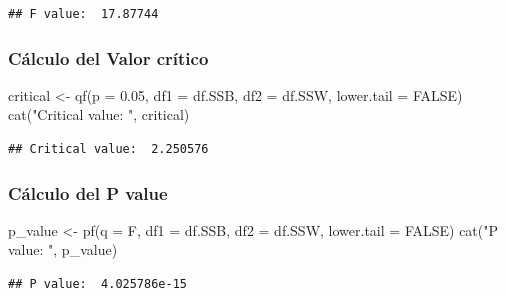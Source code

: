 \documentclass[
]{article}
\newenvironment{Shaded}{\begin{snugshade}}{\end{snugshade}}
\newcommand{\AttributeTok}[1]{\textcolor[rgb]{0.77,0.63,0.00}{#1}}
\newcommand{\ConstantTok}[1]{\textcolor[rgb]{0.00,0.00,0.00}{#1}}
\newcommand{\FloatTok}[1]{\textcolor[rgb]{0.00,0.00,0.81}{#1}}
\newcommand{\FunctionTok}[1]{\textcolor[rgb]{0.00,0.00,0.00}{#1}}
\newcommand{\NormalTok}[1]{#1}
\newcommand{\OtherTok}[1]{\textcolor[rgb]{0.56,0.35,0.01}{#1}}
\newcommand{\StringTok}[1]{\textcolor[rgb]{0.31,0.60,0.02}{#1}}
\begin{document}
\begin{verbatim}
## F value:  17.87744
\end{verbatim}

\vspace{0.3cm}

\hypertarget{cuxe1lculo-del-valor-cruxedtico}{%
\subsubsection{Cálculo del Valor
crítico}\label{cuxe1lculo-del-valor-cruxedtico}}

\vspace{0.3cm}

\begin{Shaded}
\begin{Highlighting}[]
\NormalTok{critical }\OtherTok{\textless{}{-}} \FunctionTok{qf}\NormalTok{(}\AttributeTok{p =} \FloatTok{0.05}\NormalTok{, }\AttributeTok{df1 =}\NormalTok{ df.SSB, }\AttributeTok{df2 =}\NormalTok{ df.SSW, }\AttributeTok{lower.tail =} \ConstantTok{FALSE}\NormalTok{)}
\FunctionTok{cat}\NormalTok{(}\StringTok{"Critical value: "}\NormalTok{, critical)}
\end{Highlighting}
\end{Shaded}

\begin{verbatim}
## Critical value:  2.250576
\end{verbatim}

\newpage

\hypertarget{cuxe1lculo-del-p-value}{%
\subsubsection{Cálculo del P value}\label{cuxe1lculo-del-p-value}}

\vspace{0.3cm}

\begin{Shaded}
\begin{Highlighting}[]
\NormalTok{p\_value }\OtherTok{\textless{}{-}} \FunctionTok{pf}\NormalTok{(}\AttributeTok{q =}\NormalTok{ F, }\AttributeTok{df1 =}\NormalTok{ df.SSB, }\AttributeTok{df2 =}\NormalTok{ df.SSW, }\AttributeTok{lower.tail =} \ConstantTok{FALSE}\NormalTok{)}
\FunctionTok{cat}\NormalTok{(}\StringTok{"P value: "}\NormalTok{, p\_value)}
\end{Highlighting}
\end{Shaded}

\begin{verbatim}
## P value:  4.025786e-15
\end{verbatim}
\end{document}
